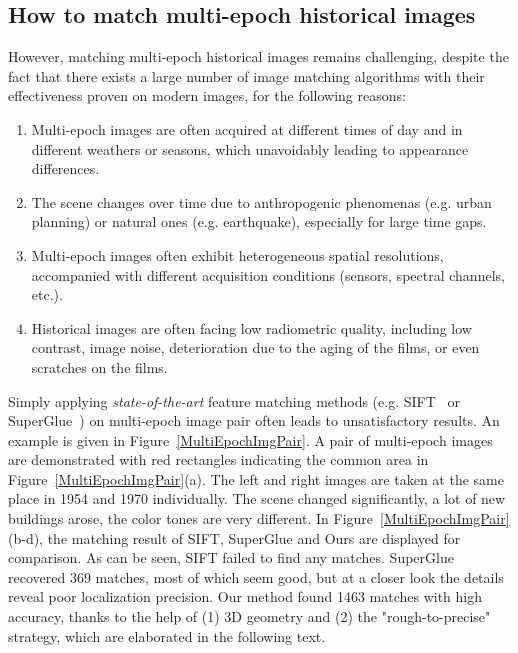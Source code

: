\subsection{How to match multi-epoch historical images}
However, matching multi-epoch historical images remains challenging, despite the fact that there exists a large number of image matching algorithms with their effectiveness proven on modern images, for the following reasons:
\begin{enumerate}
	\item Multi-epoch images are often acquired at different times of day and in different weathers or seasons, which unavoidably leading to appearance differences.
	\item The scene changes over time due to anthropogenic phenomenas (e.g. urban planning) or natural ones (e.g. earthquake), especially for large time gaps.
	\item Multi-epoch images often exhibit heterogeneous spatial resolutions, accompanied with different acquisition conditions (sensors, spectral channels, etc.).
	\item Historical images are often facing low radiometric quality, including low contrast, image noise, deterioration due to the aging of the films, or even scratches on the films.
\end{enumerate}
Simply applying \textit{state-of-the-art} feature matching methods (e.g. SIFT~\cite{lowe2004distinctive} or SuperGlue~\cite{sarlin2020superglue}) on multi-epoch image pair often leads to unsatisfactory results. An example is given in Figure~\ref{MultiEpochImgPair}. A pair of multi-epoch images are demonstrated with red rectangles indicating the common area in Figure~\ref{MultiEpochImgPair}(a). The left and right images are taken at the same place in 1954 and 1970 individually. The scene changed significantly, a lot of new buildings arose, the color tones are very different. In Figure~\ref{MultiEpochImgPair}(b-d), the matching result of SIFT, SuperGlue and Ours are displayed for comparison. As can be seen, SIFT failed to find any matches. SuperGlue recovered 369 matches, most of which seem good, but at a closer look the details reveal poor localization precision. Our method found 1463 matches with high accuracy, thanks to the help of (1) 3D geometry and (2) the "rough-to-precise" strategy, which are elaborated in the following text.
